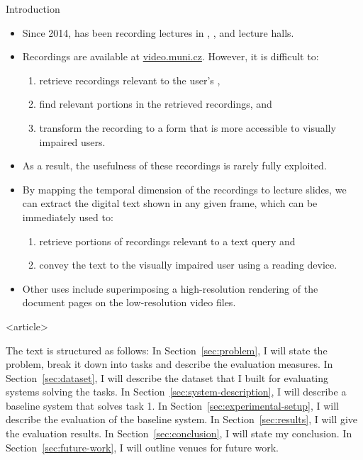 \begin{frame}{Introduction}
\begin{itemize}[<+->]
  \item Since 2014,   has been recording lectures in ,
    , and  lecture halls.~\cite{hladkaliska03lectures}
  \item Recordings are available at
    \href{https://www.video.muni.cz}{video.muni.cz}. However, it is difficult to:%
    \begin{enumerate}
      \item retrieve recordings relevant to the user's ,
      \item find relevant portions in the retrieved recordings, and
      \item transform the recording to a form that is more accessible to visually
        impaired users.
    \end{enumerate}
  \item As a result, the usefulness of these recordings is rarely fully exploited.
  \bigskip
  \item By mapping the temporal dimension of the recordings to lecture
    slides, we can extract the digital text shown in any given frame, which
    can be immediately used to:%
    \begin{enumerate}
      \item retrieve portions of recordings relevant to a text query and
      \item convey the text to the visually impaired user using a reading device.
    \end{enumerate}
  \item Other uses include superimposing a high-resolution rendering of the
     document pages on the low-resolution video files.
\end{itemize}
\end{frame}

\mode
<article>

The text is structured as follows: In Section~\ref{sec:problem}, I will
state the problem, break it down into tasks and describe the evaluation
measures. In Section~\ref{sec:dataset}, I will describe the dataset that I
built for evaluating systems solving the tasks. In
Section~\ref{sec:system-description}, I will describe a baseline system that
solves task 1. In Section~\ref{sec:experimental-setup}, I will describe the
evaluation of the baseline system. In Section~\ref{sec:results}, I will give
the evaluation results. In Section~\ref{sec:conclusion}, I will state my
conclusion. In Section~\ref{sec:future-work}, I will outline venues for future
work.

